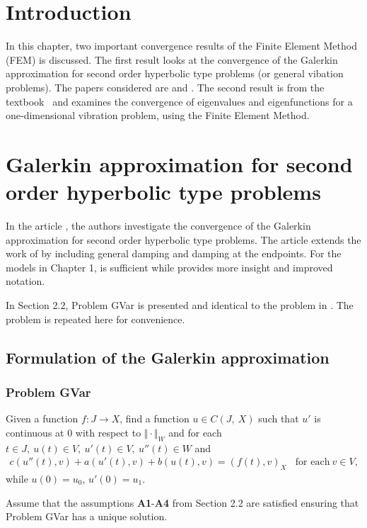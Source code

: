 \documentclass[../../main.tex]{subfiles}
\begin{document}
\section{Introduction}

In this chapter, two important convergence results of the Finite Element Method
(FEM) is discussed. The first result looks at the convergence of the Galerkin
approximation for second order hyperbolic type problems (or general vibation problems). The papers considered are \cite{BV13} and \cite{BSV17}. The second result is from the textbook~\cite{SF73} and examines the
convergence of eigenvalues and eigenfunctions for a one-dimensional vibration
problem, using the Finite Element Method.

\section{Galerkin approximation for second order hyperbolic type problems}\label{sec:convergence-of-the-galerkin-approximation}
In the article \cite{BV13}, the authors investigate the convergence of the
Galerkin approximation for second order hyperbolic type problems. The article
\cite{BSV17} extends the work of \cite{BV13} by including general damping and
damping at the endpoints. For the models in Chapter 1, \cite{BV13} is
sufficient while \cite{BSV17} provides more insight and improved notation.

In Section 2.2, Problem GVar is presented and identical to the problem in
\cite{BV13}. The problem is repeated here for convenience.

\subsection{Formulation of the Galerkin approximation}
\subsubsection*{Problem GVar}
Given a function $f:J\rightarrow X$, find a function $u\in C(J,\ X)$ such that $u'$ is continuous at $0$ with respect to
$\Vert \cdot \Vert_{W}$ and for each $t\in J,\ u(t)\in V,\ u'(t) \in V,\ u''(t)\in W$ and
\begin{eqnarray}
	c(u''(t),v)+a(u'(t),v)+b(u(t),v)= (f(t),v)_{X} \ \ \ \ \textrm{for each} \ v \in V, \label{GV_PB1}
\end{eqnarray}
while $u(0)=u_{0}$, $u'(0)=u_{1}$.

Assume that the assumptions \textbf{A1}-\textbf{A4} from Section 2.2 are
satisfied ensuring that Problem GVar has a unique solution.
\end{document}
